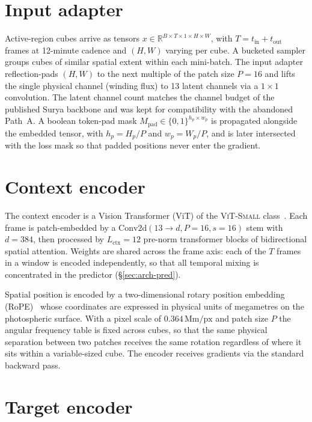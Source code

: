 \section{Input adapter}
\label{sec:arch-adapter}

Active-region cubes arrive as tensors $x \in \mathbb{R}^{B \times T
\times 1 \times H \times W}$, with $T = t_{\text{in}} + t_{\text{out}}$
frames at 12-minute cadence and $(H, W)$ varying per cube. A
bucketed sampler groups cubes of similar spatial extent within each
mini-batch. The input adapter reflection-pads $(H, W)$ to the next
multiple of the patch size $P = 16$ and lifts the single physical
channel (winding flux) to 13 latent channels via a $1 \times 1$
convolution. The latent channel count matches the channel budget of
the published Surya backbone and was kept for compatibility with the
abandoned Path~A. A boolean token-pad mask $M_{\text{pad}} \in
\{0,1\}^{h_{p} \times w_{p}}$ is propagated alongside the embedded
tensor, with $h_{p} = H_{p}/P$ and $w_{p} = W_{p}/P$, and is later
intersected with the loss mask so that padded positions never enter
the gradient.

\section{Context encoder}
\label{sec:arch-ctx}

The context encoder is a Vision Transformer (ViT) of the
\textsc{ViT-Small} class~\cite{dosovitskiy2020vit}. Each frame is patch-embedded by a
$\text{Conv2d}(13 \to d, P{=}16, s{=}16)$ stem with $d = 384$,
then processed by $L_{\text{ctx}} = 12$ pre-norm transformer blocks
of bidirectional spatial attention. Weights are shared across the
frame axis: each of the $T$ frames in a window is encoded
independently, so that all temporal mixing is concentrated in the
predictor (\S\ref{sec:arch-pred}).

Spatial position is encoded by a two-dimensional rotary position
embedding (RoPE)~\cite{su2021rope} whose coordinates are expressed in physical units of
megametres on the photospheric surface. With a pixel scale of $0.364
\,\mathrm{Mm/px}$ and patch size $P$ the angular frequency table is
fixed across cubes, so that the same physical separation between two
patches receives the same rotation regardless of where it sits within
a variable-sized cube. The encoder receives gradients via the
standard backward pass.

\section{Target encoder}
\label{sec:arch-tgt}


